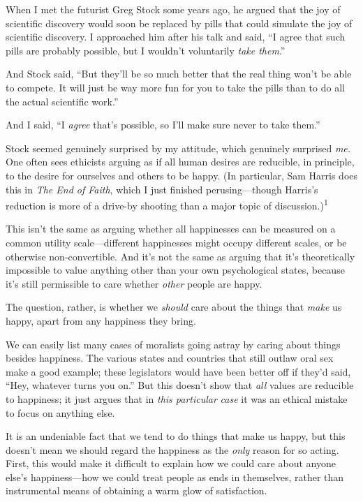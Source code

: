 
{
 When I met the futurist Greg Stock some years ago, he argued that
the joy of scientific discovery would soon be replaced by pills that
could simulate the joy of scientific discovery. I approached him after
his talk and said, ``I agree that such pills are
probably possible, but I wouldn't voluntarily
\textit{take them}.'' }

{
 And Stock said, ``But they'll be
so much better that the real thing won't be able to
compete. It will just be way more fun for you to take the pills than to
do all the actual scientific work.''}

{
 And I said, ``I \textit{agree}
that's possible, so I'll make sure
never to take them.''}

{
 Stock seemed genuinely surprised by my attitude, which genuinely
surprised \textit{me.} One often sees ethicists arguing as if all human
desires are reducible, in principle, to the desire for ourselves and
others to be happy. (In particular, Sam Harris does this in \textit{The
End of Faith}, which I just finished perusing---though
Harris's reduction is more of a drive-by shooting than
a major topic of discussion.)\textsuperscript{1}}

{
 This isn't the same as arguing whether all
happinesses can be measured on a common utility scale---different
happinesses might occupy different scales, or be otherwise
non-convertible. And it's not the same as arguing that
it's theoretically impossible to value anything other
than your own psychological states, because it's still
permissible to care whether \textit{other} people are happy.}

{
 The question, rather, is whether we \textit{should} care about the
things that \textit{make} us happy, apart from any happiness they
bring.}

{
 We can easily list many cases of moralists going astray by caring
about things besides happiness. The various states and countries that
still outlaw oral sex make a good example; these legislators would have
been better off if they'd said, ``Hey,
whatever turns you on.'' But this
doesn't show that \textit{all} values are reducible to
happiness; it just argues that in \textit{this particular}
\textit{case} it was an ethical mistake to focus on anything else.}

{
 It is an undeniable fact that we tend to do things that make us
happy, but this doesn't mean we should regard the
happiness as the \textit{only} reason for so acting. First, this would
make it difficult to explain how we could care about anyone
else's happiness---how we could treat people as ends in
themselves, rather than instrumental means of obtaining a warm glow of
satisfaction.}

